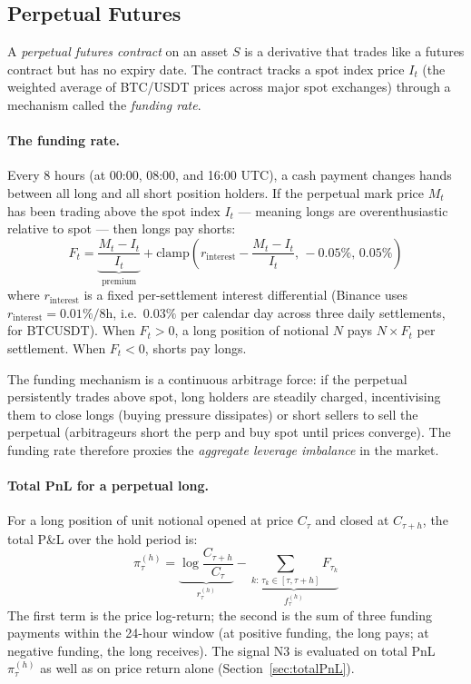 \documentclass[12pt, a4paper]{article}
\theoremstyle{plain}
\theoremstyle{definition}
\begin{document}
\subsection{Perpetual Futures}

A \emph{perpetual futures contract} on an asset $S$ is a derivative that
trades like a futures contract but has no expiry date. The contract tracks
a spot index price $I_t$ (the weighted average of BTC/USDT prices across
major spot exchanges) through a mechanism called the \emph{funding rate}.

\paragraph{The funding rate.}
Every 8 hours (at 00:00, 08:00, and 16:00 UTC), a cash payment changes hands
between all long and all short position holders. If the perpetual mark price
$M_t$ has been trading above the spot index $I_t$ --- meaning longs are
overenthusiastic relative to spot --- then longs pay shorts:
\[
  F_t = \underbrace{\frac{M_t - I_t}{I_t}}_{\text{premium}}
        + \text{clamp}\!\left(r_{\text{interest}} - \frac{M_t - I_t}{I_t},\,
                              -0.05\%,\, 0.05\%\right)
\]
where $r_{\text{interest}}$ is a fixed per-settlement interest differential
(Binance uses $r_{\text{interest}} = 0.01\%/8\text{h}$, i.e.\ $0.03\%$ per
calendar day across three daily settlements, for BTCUSDT).
When $F_t > 0$, a long position of notional $N$ pays $N \times F_t$ per
settlement. When $F_t < 0$, shorts pay longs.

The funding mechanism is a continuous arbitrage force: if the perpetual
persistently trades above spot, long holders are steadily charged,
incentivising them to close longs (buying pressure dissipates) or short
sellers to sell the perpetual (arbitrageurs short the perp and buy spot
until prices converge). The funding rate therefore proxies the
\emph{aggregate leverage imbalance} in the market.

\paragraph{Total PnL for a perpetual long.}
For a long position of unit notional opened at price $C_\tau$ and closed
at $C_{\tau+h}$, the total P\&L over the hold period is:
\[
  \pi_\tau^{(h)} = \underbrace{\log\frac{C_{\tau+h}}{C_\tau}}_{r_\tau^{(h)}}
                  - \underbrace{\sum_{k:\, \tau_k \in [\tau, \tau+h]} F_{\tau_k}}_{f_\tau^{(h)}}
\]
The first term is the price log-return; the second is the sum of three
funding payments within the 24-hour window (at positive funding, the long
pays; at negative funding, the long receives). The signal N3 is evaluated
on total PnL $\pi_\tau^{(h)}$ as well as on price return alone
(Section~\ref{sec:totalPnL}).
\end{document}
